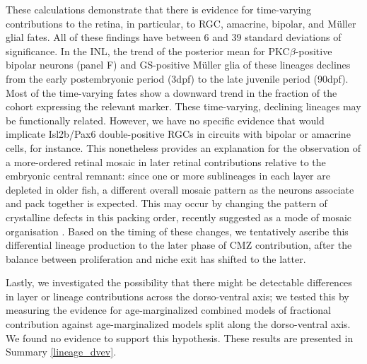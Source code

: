 These calculations demonstrate that there is evidence for time-varying contributions to the retina, in particular, to RGC, amacrine, bipolar, and M{\"u}ller glial fates. All of these findings have between 6 and 39 standard deviations of significance. In the INL, the trend of the posterior mean for PKC$\beta$-positive bipolar neurons (panel F) and GS-positive M{\"u}ller glia of these lineages declines from the early postembryonic period (3dpf) to the late juvenile period (90dpf). Most of the time-varying fates show a downward trend in the fraction of the cohort expressing the relevant marker. These time-varying, declining lineages may be functionally related. However, we have no specific evidence that would implicate Isl2b/Pax6 double-positive RGCs in circuits with bipolar or amacrine cells, for instance. This nonetheless provides an explanation for the observation of a more-ordered retinal mosaic in later retinal contributions relative to the embryonic central remnant: since one or more sublineages in each layer are depleted in older fish, a different overall mosaic pattern as the neurons associate and pack together is expected. This may occur by changing the pattern of crystalline defects in this packing order, recently suggested as a mode of mosaic organisation \cite{Nunley2019}. Based on the timing of these changes, we tentatively ascribe this differential lineage production to the later phase of CMZ contribution, after the balance between proliferation and niche exit has shifted to the latter.

Lastly, we investigated the possibility that there might be detectable differences in layer or lineage contributions across the dorso-ventral axis; we tested this by measuring the evidence for age-marginalized combined models of fractional contribution against age-marginalized models split along the dorso-ventral axis. We found no evidence to support this hypothesis. These results are presented in Summary \autoref{lineage_dvev}.

\FloatBarrier


